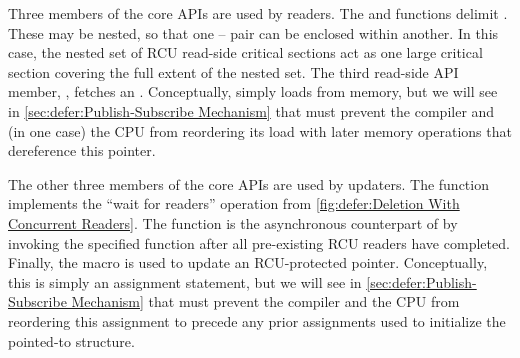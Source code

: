Three members of the core APIs are used by readers.
The  and  functions delimit
.
These may be nested, so that one --
pair can be enclosed within another.
In this case, the nested set of RCU read-side critical sections act as
one large critical section covering the full extent of the nested set.
The third read-side API member, , fetches an
.
Conceptually,  simply loads from memory, but we
will see in
\cref{sec:defer:Publish-Subscribe Mechanism}
that  must prevent the compiler and (in
one case) the CPU from reordering its load with later memory operations
that dereference this pointer.

\QuickQuizEnd

The other three members of the core APIs are used by updaters.
The  function implements the ``wait for readers''
operation from \cref{fig:defer:Deletion With Concurrent Readers}.
The  function is the asynchronous counterpart of
 by invoking the specified function after
all pre-existing RCU readers have completed.
Finally, the  macro is used to update an
RCU-protected pointer.
Conceptually, this is simply an assignment statement, but we will
see in
\cref{sec:defer:Publish-Subscribe Mechanism}
that  must prevent the compiler and the CPU
from reordering this assignment to precede any prior assignments used
to initialize the pointed-to structure.

\QuickQuizEnd

